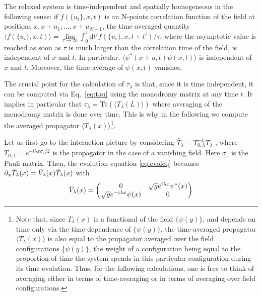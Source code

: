 \documentclass[submission,Phys,10pt]{SciPost}%
\newcommand{\comIsa}[1]{{\color{red}#1}}
\begin{document}
The relaxed system is time-independent and spatially homogeneous in the following sense: if $f(\{u_i\},x,t)$ is \comIsa{an} N-points correlation function of the field at positions $x,x+u_1,\dots ,x+u_{N-1}$,
the time-averaged quantity  
$\langle f(\{u_i\},x,t)\rangle=\underset{\tau\rightarrow\infty}{\lim} \int_0^\tau \mathrm{d} t' f(\{u_i\},x,t+t') / \tau$, where the asymptotic value is reached  as soon as $\tau$ is 
much larger than the correlation time of the field, is independent of $x$ and $t$. In particular,
$\langle \psi^*(x+u,t)\psi(x,t)\rangle$ is independent of $x$ and $t$. Moreover, the time-average of $\psi(x,t)$ vanishes. 




The crucial point for the calculation of $\tau_\lambda$ is that, since it is time independent,
it can be computed via Eq.~\eqref{eq:tau} using the monodromy matrix 
at any time $t$. It implies in particular that  $\tau_\lambda=\mathrm{Tr}(\langle T_\lambda(L)\rangle)$
where 
 averaging of the monodromy matrix is done over time. 
This is why in the following  we compute the averaged propagator   
 $\langle T_\lambda(x)\rangle$\footnote{
Note that, since $T_\lambda(x)$ is a functional of the 
field  $\{\psi(y)\}$, and depends on time only via the time-dependence of $\{\psi(y)\}$, the time-averaged propagator $\langle T_\lambda(x)\rangle $ is also equal to the propagator averaged 
over the field configurations 
$\{\psi(y)\}$, the weight of a configuration being equal to the proportion of time the system spends in this particular configuration during its time evolution. Thus, for the following calculations, one is free to think of averaging either  in terms of time-averaging or in terms of averaging over field configurations.}.
 
 
Let us first go to the interaction picture by considering 
$\tilde{T_\lambda}=T_{0,\lambda}^{-1} T_\lambda$
, 
where $T_{0,\lambda}=e^{-i\lambda x \sigma_z/2}$
is the propagator in the case of a vanishing field. Here $\sigma_z$ is the Pauli matrix. 
Then,  the evolution equation \eqref{eq:evoleq} becomes $
    \partial_{x}\Tilde{T}_{\lambda}(x)={\Tilde{V}_{\lambda}(x)}\Tilde{T}_{\lambda}(x)$
with 
\begin{equation}
\Tilde{V}_{\lambda}(x)=\begin{pmatrix}
    0 & \sqrt{g}e^{i\lambda x}\psi^*(x) \\
    \sqrt{g}e^{-i\lambda x}\psi(x) & 0
    \end{pmatrix}
    \label{eq:Utilde}
    \end{equation}
\end{document}

